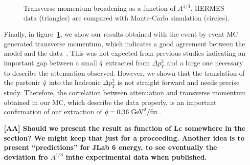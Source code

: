 \begin{figure}[tbp]
  \centering
{}
\caption {Transverse momentum broadening as a function of $A^{1/3}$. HERMES 
data \cite{Airapetian:2009jy} (triangles) are compared with Monte-Carlo 
simulation (circles).}
\label{fig:PtA}
\end{figure}

Finally, in figure~\ref{fig:PtA}, we show our results obtained with the event 
by event MC generated transverse momentum, which indicates a good agreement 
between the model and the data~\cite{Airapetian:2009jy}. This was not expected 
from previous studies indicating an important gap between a small ${\hat q}$ 
extracted from $\Delta p_T^2$ and a large one necessary to describe the 
attenuation observed. However, we shown that the translation of the partonic 
${\hat q}$ into the hadronic $\Delta p_T^2$ is not straight forward and needs 
precise study. Therefore, the correlation between attenuation and transverse 
momentum obtained in our MC, which describe the data properly, is an important 
confirmation of our extraction of ${\hat q} = 0.36\ \text{GeV}^2/ \text{fm}$.

{\bf [AA] Should we present the result as function of Lc somewhere in the section? We might keep that just for a proceeding. Another idea is to present ``predictions'' for JLab 6 energy, to see eventually the deviation fro $A^{1/3}$ inthe experimental data when published.}


